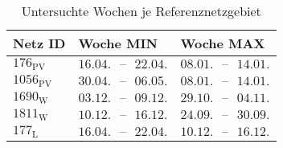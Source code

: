 {
\renewcommand{\arraystretch}{1.2}%
\begin{table}[H]
	\begin{center}
		\caption{Untersuchte Wochen je Referenznetzgebiet}
		\begin{tabu} to 0.6\textwidth {X[0.5] X[1, r] X[1, r]}
			\toprule
			Netz ID	   & Woche MIN                         & Woche MAX                         \\ \midrule
			\(176_{\text{PV}}\)  & \(16.04. \text{ {--} } 22.04.\) & \(08.01. \text{ {--} } 14.01.\) \\
			\(1056_{\text{PV}}\) & \(30.04. \text{ {--} } 06.05.\) & \(08.01. \text{ {--} } 14.01.\) \\
			\(1690_{\text{W}}\) & \(03.12. \text{ {--} } 09.12.\) & \(29.10. \text{ {--} } 04.11.\) \\
			\(1811_{\text{W}}\) & \(10.12. \text{ {--} } 16.12.\) & \(24.09. \text{ {--} } 30.09.\) \\
			\(177_{\text{L}}\)  & \(16.04. \text{ {--} } 22.04.\) & \(10.12. \text{ {--} } 16.12.\) \\ \bottomrule
		\end{tabu}
		\label{tab:extreme_weeks}
	\end{center}
	\vspace{-3mm}%
\end{table}
}